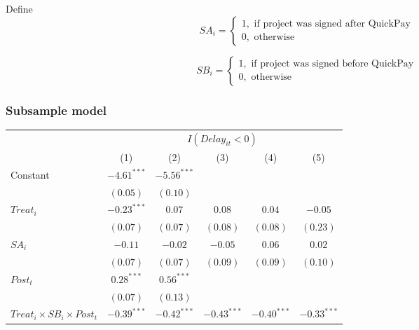 \documentclass[
]{article}
\begin{document}
Define
\[ SA_i = \begin{cases} 1, \text{ if project was signed after QuickPay}\\
0, \text{ otherwise} \end{cases}\]

\[ SB_i = \begin{cases} 1, \text{ if project was signed before QuickPay}\\
0, \text{ otherwise} \end{cases}\]

\hypertarget{subsample-model}{%
\subsubsection{Subsample model}\label{subsample-model}}

\begin{table}
\begin{center}
\begin{tabular}{l c c c c c}
\hline
 & \multicolumn{5}{c}{$I(Delay_{it}<0)$} \\
\cline{2-6}
 & (1) & (2) & (3) & (4) & (5) \\
\hline
Constant                                   & $-4.61^{***}$ & $-5.56^{***}$ &               &               &               \\
                                           & $(0.05)$      & $(0.10)$      &               &               &               \\
$Treat_i$                                  & $-0.23^{***}$ & $0.07$        & $0.08$        & $0.04$        & $-0.05$       \\
                                           & $(0.07)$      & $(0.07)$      & $(0.08)$      & $(0.08)$      & $(0.23)$      \\
$SA_i$                                     & $-0.11$       & $-0.02$       & $-0.05$       & $0.06$        & $0.02$        \\
                                           & $(0.07)$      & $(0.07)$      & $(0.09)$      & $(0.09)$      & $(0.10)$      \\
$Post_t$                                   & $0.28^{***}$  & $0.56^{***}$  &               &               &               \\
                                           & $(0.07)$      & $(0.13)$      &               &               &               \\
$Treat_i \times SB_i \times Post_t$        & $-0.39^{***}$ & $-0.42^{***}$ & $-0.43^{***}$ & $-0.40^{***}$ & $-0.33^{***}$ \\

\end{tabular}
\end{center}
\end{table}
\end{document}
